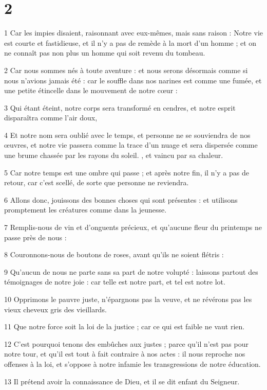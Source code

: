 \chapter{2}

\par 1 Car les impies disaient, raisonnant avec eux-mêmes, mais sans raison : Notre vie est courte et fastidieuse, et il n'y a pas de remède à la mort d'un homme ; et on ne connaît pas non plus un homme qui soit revenu du tombeau.
\par 2 Car nous sommes nés à toute aventure : et nous serons désormais comme si nous n'avions jamais été : car le souffle dans nos narines est comme une fumée, et une petite étincelle dans le mouvement de notre cœur :
\par 3 Qui étant éteint, notre corps sera transformé en cendres, et notre esprit disparaîtra comme l'air doux,
\par 4 Et notre nom sera oublié avec le temps, et personne ne se souviendra de nos œuvres, et notre vie passera comme la trace d'un nuage et sera dispersée comme une brume chassée par les rayons du soleil. , et vaincu par sa chaleur.
\par 5 Car notre temps est une ombre qui passe ; et après notre fin, il n'y a pas de retour, car c'est scellé, de sorte que personne ne reviendra.
\par 6 Allons donc, jouissons des bonnes choses qui sont présentes : et utilisons promptement les créatures comme dans la jeunesse.
\par 7 Remplis-nous de vin et d'onguents précieux, et qu'aucune fleur du printemps ne passe près de nous :
\par 8 Couronnons-nous de boutons de roses, avant qu'ils ne soient flétris :
\par 9 Qu'aucun de nous ne parte sans sa part de notre volupté : laissons partout des témoignages de notre joie : car telle est notre part, et tel est notre lot.
\par 10 Opprimons le pauvre juste, n'épargnons pas la veuve, et ne révérons pas les vieux cheveux gris des vieillards.
\par 11 Que notre force soit la loi de la justice ; car ce qui est faible ne vaut rien.
\par 12 C'est pourquoi tenons des embûches aux justes ; parce qu'il n'est pas pour notre tour, et qu'il est tout à fait contraire à nos actes : il nous reproche nos offenses à la loi, et s'oppose à notre infamie les transgressions de notre éducation.
\par 13 Il prétend avoir la connaissance de Dieu, et il se dit enfant du Seigneur.
